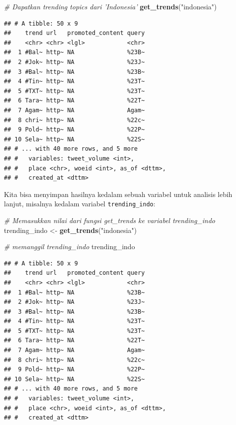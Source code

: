 \documentclass[]{tufte-handout}
\newenvironment{Shaded}{}{}
\newcommand{\KeywordTok}[1]{\textcolor[rgb]{0.00,0.44,0.13}{\textbf{#1}}}
\newcommand{\StringTok}[1]{\textcolor[rgb]{0.25,0.44,0.63}{#1}}
\newcommand{\CommentTok}[1]{\textcolor[rgb]{0.38,0.63,0.69}{\textit{#1}}}
\newcommand{\NormalTok}[1]{#1}
\begin{document}
\begin{Shaded}
\begin{Highlighting}[]
\CommentTok{# Dapatkan trending topics dari 'Indonesia'}
\KeywordTok{get_trends}\NormalTok{(}\StringTok{"indonesia"}\NormalTok{)}
\end{Highlighting}
\end{Shaded}

\begin{verbatim}
## # A tibble: 50 x 9
##    trend url   promoted_content query
##    <chr> <chr> <lgl>            <chr>
##  1 #Bal~ http~ NA               %23B~
##  2 #Jok~ http~ NA               %23J~
##  3 #Bal~ http~ NA               %23B~
##  4 #Tin~ http~ NA               %23T~
##  5 #TXT~ http~ NA               %23T~
##  6 Tara~ http~ NA               %22T~
##  7 Agam~ http~ NA               Agam~
##  8 chri~ http~ NA               %22c~
##  9 Pold~ http~ NA               %22P~
## 10 Sela~ http~ NA               %22S~
## # ... with 40 more rows, and 5 more
## #   variables: tweet_volume <int>,
## #   place <chr>, woeid <int>, as_of <dttm>,
## #   created_at <dttm>
\end{verbatim}

Kita bisa menyimpan hasilnya kedalam sebuah variabel untuk analisis
lebih lanjut, misalnya kedalam variabel \texttt{trending\_indo}:

\begin{Shaded}
\begin{Highlighting}[]
\CommentTok{# Memasukkan nilai dari fungsi get_trends ke variabel trending_indo}
\NormalTok{trending_indo <-}\StringTok{ }\KeywordTok{get_trends}\NormalTok{(}\StringTok{"indonesia"}\NormalTok{) }

\CommentTok{# memanggil trending_indo}
\NormalTok{trending_indo}
\end{Highlighting}
\end{Shaded}

\begin{verbatim}
## # A tibble: 50 x 9
##    trend url   promoted_content query
##    <chr> <chr> <lgl>            <chr>
##  1 #Bal~ http~ NA               %23B~
##  2 #Jok~ http~ NA               %23J~
##  3 #Bal~ http~ NA               %23B~
##  4 #Tin~ http~ NA               %23T~
##  5 #TXT~ http~ NA               %23T~
##  6 Tara~ http~ NA               %22T~
##  7 Agam~ http~ NA               Agam~
##  8 chri~ http~ NA               %22c~
##  9 Pold~ http~ NA               %22P~
## 10 Sela~ http~ NA               %22S~
## # ... with 40 more rows, and 5 more
## #   variables: tweet_volume <int>,
## #   place <chr>, woeid <int>, as_of <dttm>,
## #   created_at <dttm>
\end{verbatim}
\end{document}
